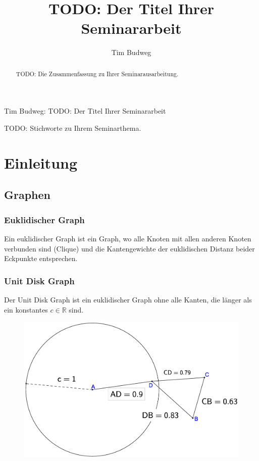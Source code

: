 \documentclass[a4paper,twoside]{IEEEtran}
\newcommand{\seminarteilnehmer}{Tim Budweg}
\newcommand{\seminartitel}{TODO: Der Titel Ihrer Seminararbeit}
\begin{document}
\title{\seminartitel}
\author{\seminarteilnehmer}

%
{\seminarteilnehmer: \seminartitel}


\maketitle

\begin{abstract}
TODO: Die Zusammenfassung zu Ihrer Seminarausarbeitung.
\end{abstract}

\begin{IEEEkeywords}
TODO: Stichworte zu Ihrem Seminarthema.
\end{IEEEkeywords}


\section{Einleitung}


\subsection{Graphen}
\subsubsection{Euklidischer Graph}
Ein euklidischer Graph ist ein Graph, wo alle Knoten mit allen anderen Knoten verbunden sind (Clique) und die Kantengewichte der euklidischen Distanz beider Eckpunkte entsprechen.
\subsubsection{Unit Disk Graph}
Der Unit Disk Graph ist ein euklidischer Graph ohne alle Kanten, die länger als ein konstantes $c \in \mathds{R} $ sind.
\begin{figure}[h!]
\centering
\includegraphics[width=0.99\linewidth]{UnitGraph.eps}
\caption{}
\label{fig:UnitGraph}
\end{figure}
\end{document}
